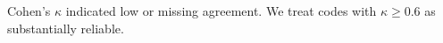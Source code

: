 Cohen's $\kappa$ indicated low or missing agreement. We treat codes with $\kappa\ge 0.6$ as substantially reliable.
